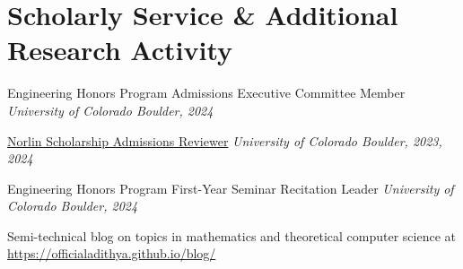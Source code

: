\documentclass[a4paper,20pt]{article}
\begin{document}
    \section{Scholarly Service \& Additional Research Activity}
    \begin{description}[font=$\bullet$]
    \item Engineering Honors Program Admissions Executive Committee Member \hfill \textit{University of Colorado Boulder, 2024}
    \vspace{-5pt}
    \item \href{https://www.colorado.edu/boettcher-daniels-norlin-scholars/norlin-scholars}{Norlin Scholarship Admissions Reviewer} \hfill \textit{University of Colorado Boulder, 2023, 2024}
    \vspace{-5pt}
    \item Engineering Honors Program First-Year Seminar Recitation Leader \hfill \textit{University of Colorado Boulder, 2024}
    \vspace{-5pt}
    \item Semi-technical blog on topics in mathematics and theoretical computer science at \href{https://officialadithya.github.io/blog/}{https://officialadithya.github.io/blog/}
    \vspace{-5pt}
    \end{description}
    
\end{document}
